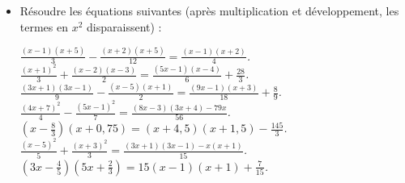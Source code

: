\begin{itemize}
\begin{itemize}
\it $\frac{2x-3}3 - \frac{x-3}6 = \frac{4x+3}4 - 17$. 
\it $\frac{5x-3}4 - \frac{7x-5}9 = \frac{x+19}6$. 
\it $\frac{5x+1}8-\frac{x-1}3 = \frac{4(2x-3)}9$. 
\it $\frac{2x-1}3 - \frac{5x+2}7 = x +13$. 
\it $\frac{8x+2}5 - \frac{x-11}7 = \frac{5x-3}2 - \frac{3x-1}4$.
\it $\frac{2x-7}9 - \frac{x-5}6 = \frac{x-9}8$. 
\it $\frac{5x+7}4 - \frac{3x+5}8 = \frac{4x+9}5 - \frac{x-9}3$. 
\it $\frac{5x+6}7 - \frac{3x+1}4 = \frac{x+16}5$. 
\it $\frac{4x+7}5 -\frac{x-5}6 = \frac{2x+14}3 - \frac{2x-7}9$. 
\end{itemize}
\item Résoudre les équations suivantes (après multiplication et développement, les termes en $x^2$ disparaissent) : 
\begin{itemize}
\it $\frac{(x-1)(x+5)}3 - \frac{(x+2)(x+5)}{12} = \frac{(x-1)(x+2)}4$.
\it $\frac{(x+1)^2}3 + \frac{(x-2)(x-3)}2 = \frac{(5x-1)(x-4)}6 + \frac{28}3$. 
\it $\frac{(3x+1)(3x-1)}9 - \frac{(x-5)(x+1)}2 = \frac{(9x-1)(x+3)}{18} + \frac89$. 
\it $\frac{(4x+7)^2}4 - \frac{(5x-1)^2}7 = \frac{(8x-3)(3x+4)-79x}{56}$. 
\it $\left(x-\frac83\right)(x+0,75) = (x+4,5)(x+1,5) - \frac{145}3$. 
\it $\frac{(x-5)^2}5 + \frac{(x+3)^2}3 = \frac{(3x+1)(3x-1)-x(x+1)}{15}$. 
\it $\left(3x-\frac45\right)\left(5x+\frac23\right)
=15 (x-1)(x+1)+\frac7{15}$. 
\end{itemize}
\end{itemize}
